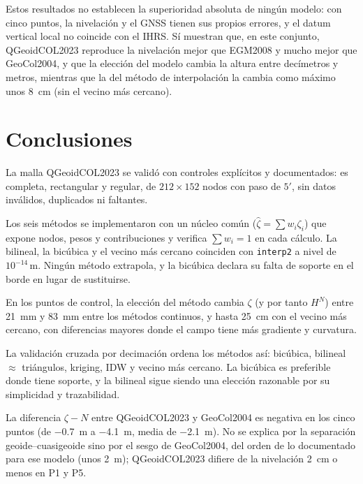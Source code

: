 \documentclass[11pt,letterpaper]{article}
\begin{document}
\noindent Estos resultados no establecen la superioridad absoluta de ningún modelo: con cinco puntos, la
nivelación y el GNSS tienen sus propios errores, y el datum vertical local no coincide con el IHRS. Sí
muestran que, en este conjunto, QGeoidCOL2023 reproduce la nivelación mejor que EGM2008 y mucho mejor
que GeoCol2004, y que la elección del modelo cambia la altura entre decímetros y metros, mientras
que la del método de interpolación la cambia como máximo unos \SI{8}{cm} (sin el vecino más cercano).

\section{Conclusiones}%

La malla QGeoidCOL2023 se validó con controles explícitos y documentados: es completa,
rectangular y regular, de $212\times152$ nodos con paso de $5'$, sin datos inválidos,
duplicados ni faltantes.

\vspace{0.3cm}
Los seis métodos se implementaron con un núcleo común ($\hat\zeta=\sum w_i\zeta_i$) que expone
nodos, pesos y contribuciones y verifica $\sum w_i=1$ en cada cálculo. La bilineal, la bicúbica
y el vecino más cercano coinciden con \texttt{interp2} a nivel de $10^{-14}$\,m. Ningún método
extrapola, y la bicúbica declara su falta de soporte en el borde en lugar de sustituirse.

\vspace{0.3cm}
En los puntos de control, la elección del método cambia $\zeta$ (y por tanto $H^N$) entre
\SI{21}{mm} y \SI{83}{mm} entre los métodos continuos, y hasta \SI{25}{cm} con el vecino más
cercano, con diferencias mayores donde el campo tiene más gradiente y curvatura.

\vspace{0.3cm}
La validación cruzada por decimación ordena los métodos así: bicúbica, bilineal $\approx$
triángulos, kriging, IDW y vecino más cercano. La bicúbica es preferible donde tiene soporte, y
la bilineal sigue siendo una elección razonable por su simplicidad y trazabilidad.

\vspace{0.3cm}
La diferencia $\zeta-N$ entre QGeoidCOL2023 y GeoCol2004 es negativa en los cinco puntos (de
\SI{-0.7}{m} a \SI{-4.1}{m}, media de \SI{-2.1}{m}). No se explica por la separación
geoide--cuasigeoide sino por el sesgo de GeoCol2004, del orden de lo documentado para ese modelo
(unos \SI{2}{m}); QGeoidCOL2023 difiere de la nivelación \SI{2}{cm} o menos en P1 y P5.
\end{document}
